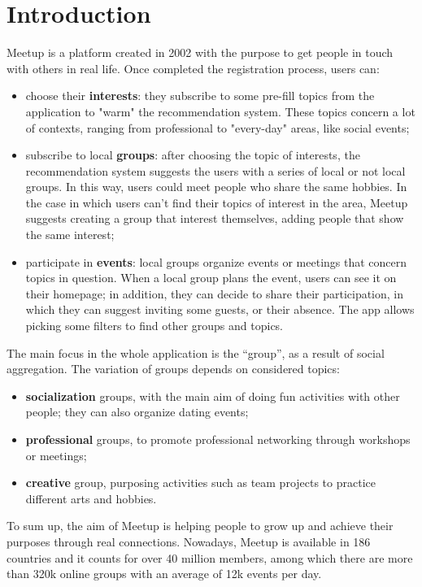 \documentclass[10pt]{article}
\begin{document}
\newpage
\tableofcontents
\newpage
\section{Introduction \label{sec:intro}}
Meetup is a platform created in 2002 with the purpose to get people in touch with others in real life. Once completed the registration process, users can:
\begin{itemize}
\item choose their \textbf{interests}: they subscribe to some pre-fill topics from the application to "warm" the recommendation system. 
These topics concern a lot of contexts, ranging from professional to "every-day" areas, like social events;
\item subscribe to local \textbf{groups}: after choosing the topic of interests, the recommendation system suggests the users with a series of local or not local groups. 
In this way, users could meet people who share the same hobbies. In the case in which users can’t find their topics of interest in the area, Meetup suggests creating a group that interest themselves, adding people that show the same interest;
\item participate in \textbf{events}: local groups organize events or meetings that concern topics in question. When a local group plans the event, users can see it on their homepage; in addition, they can decide to share their participation, in which they can suggest inviting some guests, or their absence. The app allows picking some filters to find other groups and topics.
\end{itemize}
The main focus in the whole application is the “group”, as a result of social aggregation. 
The variation of groups depends on considered topics:
\begin{itemize}
\item \textbf{socialization} groups, with the main aim of doing fun activities with other people; they can also organize dating events;
\item \textbf{professional} groups, to promote professional networking through workshops or meetings;
\item \textbf{creative} group, purposing activities such as team projects to practice different arts and hobbies. 
\end{itemize}
To sum up, the aim of Meetup is helping people to grow up and achieve their purposes through real connections. 
Nowadays, Meetup is available in 186 countries and it counts for over 40 million members, among which there are more than 320k online groups with an average of 12k events per day. 
\end{document}
